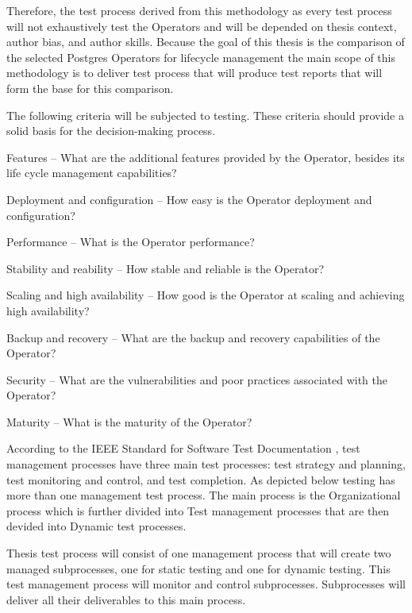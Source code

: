 Therefore, the test process derived from this methodology as every test process will not exhaustively test the Operators and will be depended on thesis context, author bias, and author skills. Because the goal of this thesis is the comparison of the selected Postgres Operators for lifecycle management the main scope of this methodology is to deliver test process that will produce test reports that will form the base for this comparison.

The following criteria will be subjected to testing. These criteria should provide a solid basis for the decision-making process.
\begin{criterias}
  \item	Features – What are the additional features provided by the Operator, besides its life cycle management capabilities?
  \item	Deployment and configuration – How easy is the Operator deployment and configuration?
  \item	Performance – What is the Operator performance?
  \item	Stability and reability – How stable and reliable is the Operator?
  \item	Scaling and high availability – How good is the Operator at scaling and achieving high availability?
  \item	Backup and recovery – What are the backup and recovery capabilities of the Operator?
  \item	Security – What are the vulnerabilities and poor practices associated with the Operator?
  \item	Maturity – What is the maturity of the Operator?
\end{criterias}



According to the IEEE Standard for Software Test Documentation \cite{ieeeTestProcess}, test management processes have three main test processes: test strategy and planning, test monitoring and control, and test completion.
As depicted below testing has more than one management test process. The main process is the Organizational process which is further divided into Test management processes that are then devided into Dynamic test processes.


Thesis test process will consist of one management process that will create two managed subprocesses, one for static testing and one for dynamic testing. This test management process will monitor and control subprocesses. Subprocesses will deliver all their deliverables to this main process.

